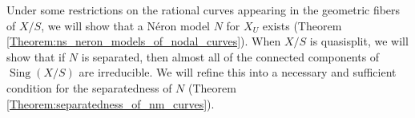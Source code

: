 \documentclass[a4paper,12pt]{amsart} %
\numberwithin{equation}{subsection}
\newcommand{\on}[1]{\operatorname{#1}}
\def\Sing{\operatorname{Sing}}
\theoremstyle{definition}
\theoremstyle{plain}%
\newtheorem{theorem}[definition]{Theorem}
\theoremstyle{remark}
\renewcommand{\O}{\mathcal{O}}
\begin{document}
	Under some restrictions on the rational curves appearing in the geometric fibers of $X/S$, we will show that a Néron model $N$ for $X_U$ exists (Theorem \ref{Theorem:ns_neron_models_of_nodal_curves}). When $X/S$ is quasisplit, we will show that if $N$ is separated, then almost all of the connected components of $\Sing(X/S)$ are irreducible. We will refine this into a necessary and sufficient condition for the separatedness of $N$ (Theorem \ref{Theorem:separatedness_of_nm_curves}).



\end{document}
